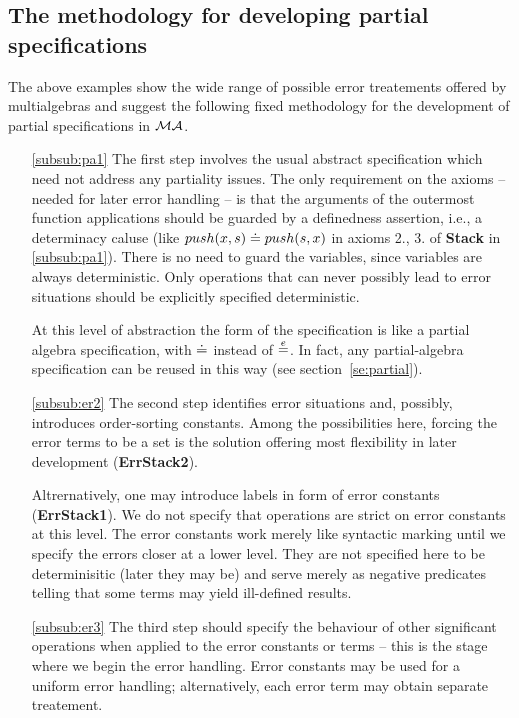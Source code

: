 \documentclass[10pt]{article}
\begin{document}
\subsection{The methodology for developing partial specifications}\label{sec:meto}
The above examples show the wide range of possible error treatements offered
by multialgebras and suggest the following fixed methodology
for the development of partial specifications in ${\mathcal{MA}}$. 

\begin{enumerate}\MyLPar
\item[\ref{subsub:pa1}] The first step involves the usual abstract specification which need not
        address any partiality issues. The only requirement on the axioms --
	needed for later error handling -- is that
	the arguments of the outermost function applications
	should be guarded by a definedness assertion, i.e., a
	determinacy caluse (like $push(x,s)\mathrel{\dot{=} } push(s,x)$ in axioms 2.,
	3. of {\bf Stack} in \ref{subsub:pa1}).
	There is no need to guard the variables, 
	since variables are always deterministic. Only
	operations that can never possibly lead to error situations should be
	explicitly
	specified deterministic. 

	At this level of abstraction the form of
	the specification is like a partial algebra specification, with
	$\mathrel{\dot{=} }$ instead of $\stackrel{e}{=}$. In fact, any partial-algebra specification
	can be reused in this way (see section~\ref{se:partial}).

\item[\ref{subsub:er2}] The second step identifies error situations and,
        possibly, introduces order-sorting constants. Among the possibilities
	here, forcing the error terms to be a set
	 is the solution offering most flexibility in
	later development ({\bf ErrStack2}). 

	Altrernatively, one may introduce labels in form of error constants
	({\bf ErrStack1}). We do not specify that operations
	are strict on error constants at this level. The error constants 
	work merely like syntactic marking until we specify the errors closer
	at a lower level. They are not specified here to be determinisitic
	(later they may be) and serve merely as negative predicates
	telling that some terms may yield ill-defined results.

\item[\ref{subsub:er3}] The third step  should specify the behaviour of other
significant operations when applied to the error constants or terms -- 
	this is the stage where we begin the
	error handling. Error constants may be used for a uniform error
	handling; alternatively, each error term may obtain separate
	treatement.


\end{enumerate}
\end{document}
